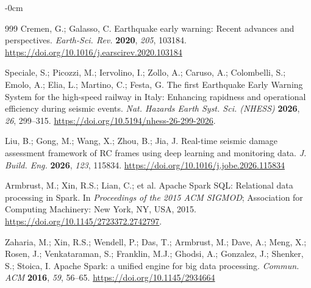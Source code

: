\documentclass[data,article,accept,pdftex,moreauthors]{Definitions/mdpi}
\begin{document}
\begin{adjustwidth}{-\extralength}{0cm}
\begin{thebibliography}{999}
Cremen, G.; Galasso, C. Earthquake early warning: Recent advances and perspectives. \emph{Earth-Sci. Rev.} \textbf{2020}, \emph{205}, 103184. \url{https://doi.org/10.1016/j.earscirev.2020.103184}

Speciale, S.; Picozzi, M.; Iervolino, I.; Zollo, A.; Caruso, A.; Colombelli, S.; Emolo, A.; Elia, L.; Martino, C.; Festa, G. The first Earthquake Early Warning System for the high-speed railway in Italy: Enhancing rapidness and operational efficiency during seismic events. \emph{Nat. Hazards Earth Syst. Sci. (NHESS)} \textbf{2026}, \emph{26}, 299--315. \url{https://doi.org/10.5194/nhess-26-299-2026}.

Liu, B.; Gong, M.; Wang, X.; Zhou, B.; Jia, J. Real-time seismic damage assessment framework of RC frames using deep learning and monitoring data. \emph{J. Build. Eng.} \textbf{2026}, \emph{123}, 115834. \url{https://doi.org/10.1016/j.jobe.2026.115834}

Armbrust, M.; Xin, R.S.; Lian, C.; et al. Apache Spark SQL: Relational data processing in Spark. In \emph{Proceedings of the 2015 ACM SIGMOD}; Association for Computing Machinery: New York, NY, USA,  %
 2015. \url{https://doi.org/10.1145/2723372.2742797}.

Zaharia, M.; Xin, R.S.; Wendell, P.; Das, T.; Armbrust, M.; Dave, A.; Meng, X.; Rosen, J.; Venkataraman, S.; Franklin, M.J.; Ghodsi, A.; Gonzalez, J.; Shenker, S.; Stoica, I. Apache Spark: a unified engine for big data processing. %
\emph{Commun. ACM} \textbf{2016}, \emph{59}, 56--65. \url{https://doi.org/10.1145/2934664}


\end{thebibliography}
\end{adjustwidth}
\end{document}
